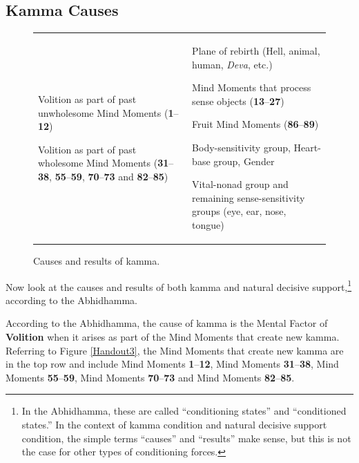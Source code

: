 \subsection*{Kamma Causes}

\begin{figure}[H]

\begin{tabular*}{\textwidth}{L{\tabcolsep} | L{\tabcolsep}}
\toprule
{} &  \\
\midrule

Volition as part of past unwholesome Mind Moments (\textbf{1}--\textbf{12})

\vspace{2mm}

Volition as part of past wholesome Mind Moments (\textbf{31}--\textbf{38}, \textbf{55}--\textbf{59}, \textbf{70}--\textbf{73} and \textbf{82}--\textbf{85})
&
Plane of rebirth (Hell, animal, human, \textit{Deva}, etc.)

\vspace{2mm}

Mind Moments that process sense objects (\textbf{13}--\textbf{27})

\vspace{2mm}

Fruit Mind Moments (\textbf{86}--\textbf{89})

\vspace{2mm}

Body-sensitivity group, Heart-base group, Gender
\vspace{2mm}

Vital-nonad group and remaining sense-sensitivity groups (eye, ear, nose, tongue)
 \\
 
\bottomrule
\end{tabular*}
\caption{Causes and results of kamma.}
\label{fig:Kamma}
\end{figure}

Now look at the causes and results of both kamma and natural decisive support,\footnote{In the Abhidhamma, these are called “conditioning states” and “conditioned states.” In the context of kamma condition and natural decisive support condition, the simple terms “causes” and “results” make sense, but this is not the case for other types of conditioning forces.} according to the Abhidhamma.

According to the Abhidhamma, the cause of kamma is the Mental Factor of \textbf{Volition} when it arises as part of the Mind Moments that create new kamma. Referring to Figure \ref{Handout3}, the Mind Moments that create new kamma are in the top row and include Mind Moments \textbf{1}--\textbf{12}, Mind Moments \textbf{31}--\textbf{38}, Mind Moments \textbf{55}--\textbf{59}, Mind Moments \textbf{70}--\textbf{73} and Mind Moments \textbf{82}--\textbf{85}.

